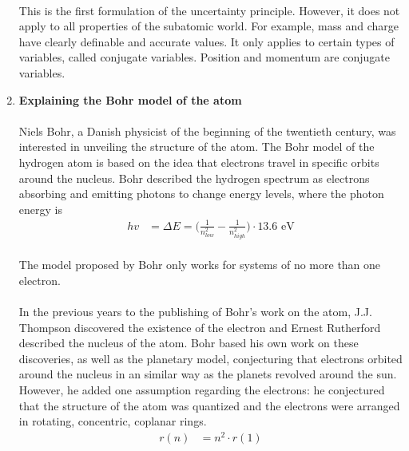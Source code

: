\documentclass[letter]{article}
\begin{document}
\begin{enumerate}
     \paragraph{} This is the first formulation of the uncertainty principle. However, it does not apply to all properties of the subatomic world. For example, mass and charge have clearly definable and accurate values. It only applies to certain types of variables, called conjugate variables. Position and momentum are conjugate variables. 
    \vspace{10mm}

    \item \textbf{Explaining the Bohr model of the atom}
    
    \paragraph{}Niels Bohr, a Danish physicist of the beginning of the twentieth century, was interested in unveiling the structure of the atom. The Bohr model of the hydrogen atom is based on the idea that electrons travel in specific orbits around the nucleus. Bohr described the hydrogen spectrum as electrons absorbing and emitting photons to change energy levels, where the photon energy is
    \begin{equation}
        \begin{split}
            hv &= \Delta E=\bigg(\frac{1}{n_{low}^2}-\frac{1}{n_{high}^2}\bigg)\cdot13.6 \text{ eV}
        \end{split}
    \end{equation}
    \paragraph{}The model proposed by Bohr only works for systems of no more than one electron.
    \paragraph{}In the previous years to the publishing of Bohr's work on the atom, J.J. Thompson discovered the existence of the electron and Ernest Rutherford described the nucleus of the atom. Bohr based his own work on these discoveries, as well as the planetary model, conjecturing that electrons orbited around the nucleus in an similar way as the planets revolved around the sun. However, he added one assumption regarding the electrons: he conjectured that the structure of the atom was quantized and the electrons were arranged in rotating, concentric, coplanar rings. 
    \begin{equation}
        \begin{split}
            r(n) &= n^2\cdot r(1)
        \end{split}
    \end{equation}

\end{enumerate}
\end{document}
